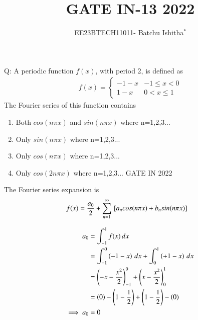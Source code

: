 \documentclass[journal,12pt,onecolumn]{IEEEtran}
\theoremstyle{remark}
\begin{document}
\let\vec\mathbf



\title{ GATE IN-13 2022}
\author{EE23BTECH11011- Batchu Ishitha$^{*}$%
}
\maketitle




\bigskip

\renewcommand{\thefigure}{\theenumi}
\renewcommand{\thetable}{\theenumi}

Q: A periodic function $f(x)$, with period 2, is defined as \\
   \begin{align}   
   f(x) =
   \begin{cases}
    -1-x & -1 \leq x<0 \\
     1-x &  0 <x \leq1 
   \end{cases}
   \end{align} 
   The Fourier series of this function contains \\
\begin{enumerate}[label=\Alph*.]
\item Both $cos(n\pi x)$ and $sin(n\pi x)$ where n=1,2,3...
\item Only $sin(n\pi x)$ where n=1,2,3...
\item Only $cos(n\pi x)$ where n=1,2,3...
\item Only $cos(2n\pi x)$ where n=1,2,3...  \hfill{GATE IN 2022 }
\end{enumerate} 

\solution

The Fourier series expansion is 
\begin{align}
f(x) &= \frac{a_0}{2} + \sum_{n=1}^{\infty}{}\left[{a_n}cos(n \pi x) + {b_n}sin(n \pi x)\right] 
\end{align}

\begin{align}
{a_0} &= \int_{-1}^{1} f(x) \, dx \\
&= \int_{-1}^{0} \left(-1-x\right) \, dx + \int_{0}^{1} \left(+1-x\right) \, dx \\
&= \left(-x -\frac{x^2}{2}\right)_{-1}^{0} + \left(x -\frac{x^2}{2}\right)_{0}^{1} \\
&= \left(0\right) - \left(1 - \frac{1}{2}\right) + \left(1 - \frac{1}{2}\right) - \left(0\right) \\
\implies {a_0}&= 0
\end{align}
\end{document}
